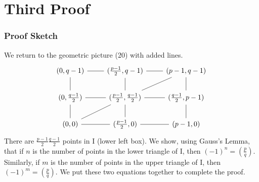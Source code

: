 \documentclass{article}
\newcommand{\legendre}[2]{\genfrac{(}{)}{}{}{#1}{#2}}
\begin{document}
\section{Third Proof}
\subsubsection{Proof Sketch}
We return to the geometric picture (20) with added lines.
\begin{equation}
    \begin{tikzcd}
{(0, q-1)} \arrow[r, no head]                                                & {(\frac{p-1}{2},q-1)} \arrow[r, no head]                                                                     & {(p-1, q-1)}                              \\
{(0,\frac{q-1}{2})} \arrow[d, no head] \arrow[r, no head] \arrow[u, no head] & {(\frac{p-1}{2},\frac{q-1}{2})} \arrow[d, no head] \arrow[r, no head] \arrow[u, no head] \arrow[ru, no head] & {(\frac{q-1}{2}, p-1)} \arrow[u, no head] \\
{(0,0)} \arrow[ru, no head]                                                  & {(\frac{p-1}{2},0)} \arrow[l, no head] \arrow[r, no head]                                                    & {(p-1,0)} \arrow[u, no head]             
\end{tikzcd}
\end{equation}
There are $\frac{p-1}{2}\frac{q-1}{2}$ points in I (lower left box). We show, using Gauss's Lemma, that if $n$ is the number of points in the lower triangle of I, then $(-1)^{n} = \legendre{p}{q}$. Similarly, if $m$ is the number of points in the upper triangle of I, then $(-1)^{m} = \legendre{p}{q}$. We put these two equations together to complete the proof.
\end{document}
